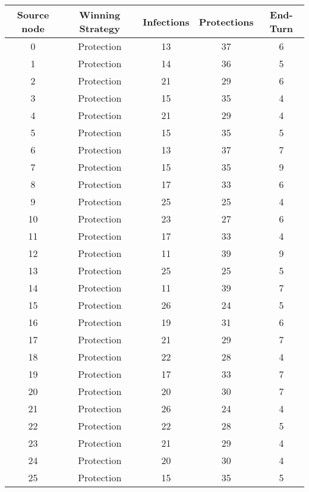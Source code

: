 \documentclass[results.tex]{subfiles}
\begin{document}
\begin{center}
  \begin{tabular}{| c || c | c | c | c |}
    \hline
    {\bfseries Source node} & {\bfseries Winning Strategy} & {\bfseries Infections} & {\bfseries Protections} & {\bfseries End-Turn} \\  %
    \hline\hline
    0 & Protection & 13 & 37 & 6 \\ 
    \hline
    1 & Protection & 14 & 36 & 5 \\ 
    \hline
    2 & Protection & 21 & 29 & 6 \\ 
    \hline
    3 & Protection & 15 & 35 & 4 \\ 
    \hline
    4 & Protection & 21 & 29 & 4 \\ 
    \hline
    5 & Protection & 15 & 35 & 5 \\ 
    \hline
    6 & Protection & 13 & 37 & 7 \\ 
    \hline
    7 & Protection & 15 & 35 & 9 \\ 
    \hline
    8 & Protection & 17 & 33 & 6 \\ 
    \hline
    9 & Protection & 25 & 25 & 4 \\ 
    \hline
    10 & Protection & 23 & 27 & 6 \\ 
    \hline
    11 & Protection & 17 & 33 & 4 \\ 
    \hline
    12 & Protection & 11 & 39 & 9 \\ 
    \hline
    13 & Protection & 25 & 25 & 5 \\ 
    \hline
    14 & Protection & 11 & 39 & 7 \\ 
    \hline
    15 & Protection & 26 & 24 & 5 \\ 
    \hline
    16 & Protection & 19 & 31 & 6 \\ 
    \hline
    17 & Protection & 21 & 29 & 7 \\ 
    \hline
    18 & Protection & 22 & 28 & 4 \\ 
    \hline
    19 & Protection & 17 & 33 & 7 \\ 
    \hline
    20 & Protection & 20 & 30 & 7 \\ 
    \hline
    21 & Protection & 26 & 24 & 4 \\ 
    \hline
    22 & Protection & 22 & 28 & 5 \\ 
    \hline
    23 & Protection & 21 & 29 & 4 \\ 
    \hline
    24 & Protection & 20 & 30 & 4 \\ 
    \hline
    25 & Protection & 15 & 35 & 5 \\ 

\end{tabular}
\end{center}
\end{document}
